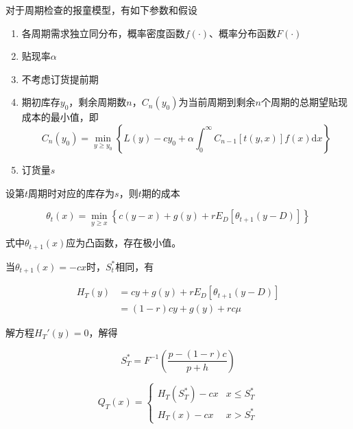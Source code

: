 \documentclass{../notes}
\begin{document}
    对于周期检查的报童模型，有如下参数和假设

    \begin{enumerate}
        \item 各周期需求独立同分布，概率密度函数$f(\cdot)$、概率分布函数$F(\cdot)$
        \item 贴现率$\alpha$
        \item 不考虑订货提前期
        \item 期初库存$y_0$，剩余周期数$n$，$C_n(y_0)$为当前周期到剩余$n$个周期的总期望贴现成本的最小值，即
        \begin{equation*}
            C_n\left(y_0\right) = \min_{y\geq y_0}\left\{L(y) - cy_0 + \alpha\int_0^\infty C_{n-1}[t(y, x)]f(x)\mathrm dx\right\}
        \end{equation*}
        \item 订货量$s$
    \end{enumerate}

    设第$t$周期时对应的库存为$s$，则$t$期的成本

    \begin{equation*}
        \theta_t(x) = \min_{y\geq x}\left\{c(y-x) + g(y) + rE_D\left[\theta_{t+1}(y-D)\right]\right\}
    \end{equation*}

    式中$\theta_{t+1}(x)$应为凸函数，存在极小值。

    当$\theta_{t+1}(x) = -cx$时，$S_t^*$相同，有

    \begin{equation*}
        \begin{aligned}
            H_T(y) &= cy + g(y) + rE_D[\theta_{t+1}(y-D)] \\
            &= (1-r)cy + g(y) + rc\mu
        \end{aligned}
    \end{equation*}

    解方程$H_T'(y) = 0$，解得

    \begin{equation*}
        S_T^* = F^{-1}\left(\frac{p - (1-r) c}{p+h}\right)
    \end{equation*}

    \begin{equation}
        Q_T(x) = \begin{cases}
            H_T(S_T^*) - cx & x\leq S_T^* \\
            H_T(x) - cx & x > S_T^*
        \end{cases}
    \end{equation}
\end{document}
